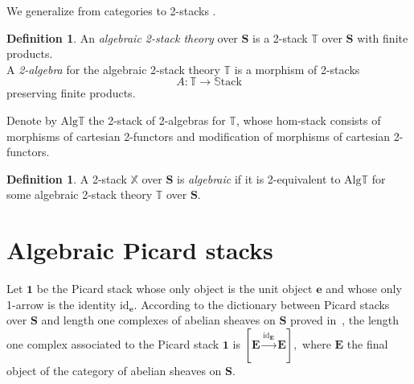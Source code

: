 \documentclass[11pt]{amsart}
\newcommand{\STACK}{\mathbb{S}\mathrm{tack}}
\newcommand{\id}{\mathrm{id}}
\newcommand{\bS}{\textbf{S}}
\newcommand{\bfu}{\textbf{1}}
\newcommand{\twoX}{\mathbb{X}}
\newcommand{\twoT}{\mathbb{T}}
\newcommand{\Alg}{\mathrm{Alg}}
\theoremstyle{definition}
\newtheorem{definition}[theorem]{Definition}
\numberwithin{equation}{section}
\begin{document}
\medskip

We generalize from categories to 2-stacks \cite[Chapter 1, Definition 1.1]{AdRoVi}.

\begin{definition}\label{def-alg-2-st-2-alg}
	 An \textit{algebraic 2-stack theory} over $\bS$ is a 2-stack $\twoT$ over $\bS$ with finite products. \\
		A \textit{2-algebra} for the algebraic 2-stack theory $\twoT$ is a morphism of 2-stacks 
	$$A: \twoT \longrightarrow \STACK$$
	 preserving finite products.
	\end{definition}


	  Denote by $\Alg \twoT $
	  the 2-stack of 2-algebras for $\twoT$, whose hom-stack consists of morphisms of cartesian 2-functors and modification of morphisms of cartesian 2-functors. 
	  
	  
	  \begin{definition}\label{alg-2-st}
		 A 2-stack $\twoX$ over $\bS$ is \textit{algebraic} if it is 2-equivalent to $\Alg \twoT$ for some algebraic 2-stack theory $\twoT$ over $\bS$.
\end{definition}


\section{Algebraic Picard stacks}\label{Alg-Pic-St}

Let $\bfu$ be the Picard stack whose only object is the unit object $ \mathbf{e}$ and whose only 1-arrow is the identity $\id_\mathbf{e}$. According to the dictionary between Picard stacks over $\bS$ and length one complexes of abelian sheaves on $\bS$ proved in~\cite[\S 1.4]{De},
the length one complex associated to the Picard stack $\bfu$ is $[  \mathbf{E} \stackrel{\id_\mathbf{E}}{\rightarrow} \mathbf{E}],$ where $\mathbf{E}$ the final object of the category of abelian sheaves on $\bS$.
\end{document}
